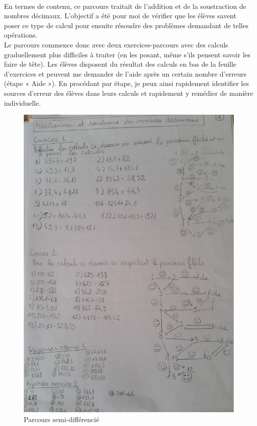 \paragraph{} En termes de contenu, ce parcours traitait de l'addition et de la soustraction de nombres décimaux. L'objectif a été pour moi de vérifier que les élèves savent poser ce type de calcul pour ensuite résoudre des problèmes demandant de telles opérations.\\
Le parcours commence donc avec deux exercices-parcours avec des calculs graduellement plus difficiles à traiter (en les posant, même s'ils pensent savoir les faire de tête). Les élèves disposent du résultat des calculs en bas de la feuille d'exercices et peuvent me demander de l'aide après un certain nombre d'erreurs (étape « Aide »). En procédant par étape, je peux ainsi rapidement identifier les sources d'erreur des élèves dans leurs calculs et rapidement y remédier de manière individuelle.\\
\begin{figure}[!h]
	\centering
	\includegraphics[scale=0.4]{img/parcours_decimaux.jpg}
	\caption{Parcours semi-différencié}
\end{figure}
